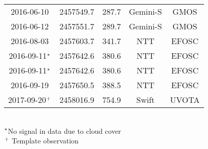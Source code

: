 \begin{table*}
\begin{tabular}{ccccc}
2016-06-10 & 2457549.7 & 287.7 & Gemini-S & GMOS \\
2016-06-12 & 2457551.7 & 289.7 & Gemini-S & GMOS \\
2016-08-03 & 2457603.7 & 341.7 & NTT & EFOSC \\
2016-09-11$\rm{^{*}}$ & 2457642.6 & 380.6 & NTT & EFOSC \\
2016-09-11$\rm{^{*}}$ & 2457642.6 & 380.6 & NTT & EFOSC \\
2016-09-19 & 2457650.5 & 388.5 & NTT & EFOSC \\
2017-09-20$\rm{^{+}}$ & 2458016.9 & 754.9 & Swift & UVOTA \\
\hline
\end{tabular}
\\$\rm{^{*}}$No signal in data due to cloud cover\\ $\rm{^{+}}$ Template observation
\end{table*}
